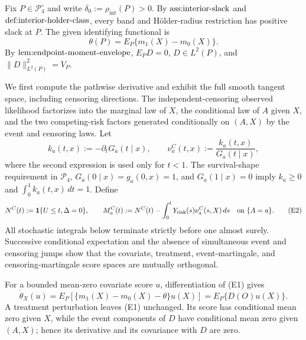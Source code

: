 Fix \(P\in\mathcal P_4^{\circ}\) and write \(\delta_0:=\rho_{\mathrm{int}}(P)>0\).  By \(\textnormal{ass:interior-slack}\) and \(\textnormal{def:interior-holder-class}\), every band and H\"older-radius restriction has positive slack at \(P\).  The given identifying functional is
\[
 \theta(P)=E_P\{m_1(X)-m_0(X)\}.                                      \tag{E1}
\]
By \(\textnormal{lem:endpoint-moment-envelope}\), \(E_PD=0\), \(D\in L^2(P)\), and \(\lVert D\rVert_{L^2(P)}^2=V_P\).

We first compute the pathwise derivative and exhibit the full smooth tangent space, including censoring directions.  The independent-censoring observed likelihood factorizes into the marginal law of \(X\), the conditional law of \(A\) given \(X\), and the two competing-risk factors generated conditionally on \((A,X)\) by the event and censoring laws.  Let
\[
 k_a(t,x):=-\partial_tG_a(t\mid x),\qquad
 \nu_a^C(t,x):=\frac{k_a(t,x)}{G_a(t\mid x)},
\]
where the second expression is used only for \(t<1\).  The survival-shape requirement in \(\mathcal P_4\), \(G_a(0\mid x)=g_a(0,x)=1\), and \(G_a(1\mid x)=0\) imply \(k_a\ge0\) and \(\int_0^1k_a(t,x)\,dt=1\).  Define
\[
 N^C(t):=\mathbf 1\{U\le t,\Delta=0\},\qquad
 M_a^C(t):=N^C(t)-\int_0^tY_{\mathrm{risk}}(s)\nu_a^C(s,X)\,ds
 \quad\hbox{on }\{A=a\}.                                             \tag{E2}
\]
All stochastic integrals below terminate strictly before one almost surely.  Successive conditional expectation and the absence of simultaneous event and censoring jumps show that the covariate, treatment, event-martingale, and censoring-martingale score spaces are mutually orthogonal.

For a bounded mean-zero covariate score \(u\), differentiation of (E1) gives
\[
 \dot\theta_X(u)=E_P[\{m_1(X)-m_0(X)-\theta\}u(X)]
                 =E_P\{D(O)u(X)\}.                                   \tag{E3}
\]
A treatment perturbation leaves (E1) unchanged.  Its score has conditional mean zero given \(X\), while the event components of \(D\) have conditional mean zero given \((A,X)\); hence its derivative and its covariance with \(D\) are zero.

